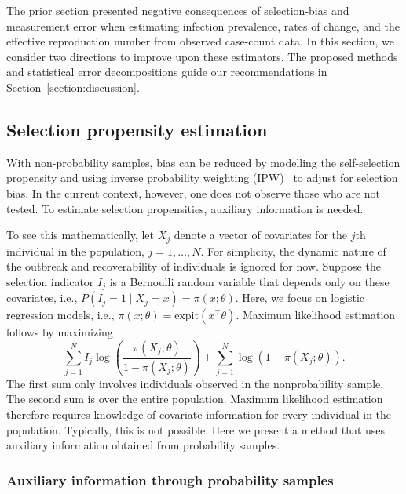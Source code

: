 \documentclass[11pt]{amsart}
\numberwithin{equation}{section}
\theoremstyle{plain}
\begin{document}
 The prior section presented negative consequences of selection-bias and measurement error when estimating infection prevalence, rates of change, and the effective reproduction number from observed case-count data.  In this section, we consider two directions to improve upon these estimators.
 The proposed methods and statistical error decompositions guide our recommendations in Section~\ref{section:discussion}.

 \subsection{Selection propensity estimation}

 With non-probability samples, bias can be reduced by modelling the self-selection propensity and using inverse probability weighting (IPW)~\citep{Elliott2017} to adjust for selection bias.
 In the current context, however, one does not observe those who are not tested.  To estimate selection propensities, auxiliary information is needed.

 To see this mathematically, let $X_j$ denote a vector of covariates for the $j$th individual in the population, $j=1,\ldots,N$.  For simplicity, the dynamic nature of the outbreak and recoverability of individuals is ignored for now. Suppose the selection indicator $I_j$ is a Bernoulli random variable that depends only on these covariates, i.e., $P(I_j = 1 \mid X_j = x) = \pi (x; \theta)$. Here, we focus on logistic regression models, i.e., $\pi(x; \theta) = \text{expit} \left( x^\top \theta \right)$. Maximum likelihood estimation follows by maximizing
 \begin{equation}
 \label{eq:propensity}
 \sum_{j=1}^N I_j \log \left( \frac{\pi (X_j; \theta)}{1-\pi(X_j; \theta)} \right) + \sum_{j=1}^N \log \left( 1 - \pi (X_j; \theta) \right).
 \end{equation}
 The first sum only involves individuals observed in the nonprobability sample.
 The second sum is over the entire population.  Maximum likelihood estimation therefore requires knowledge of covariate information for every individual in the population.  Typically, this is not possible.  Here we present a method that uses auxiliary information obtained from probability samples.

 \subsubsection{Auxiliary information through probability samples}
 \label{subsec:auxprob}
\end{document}
